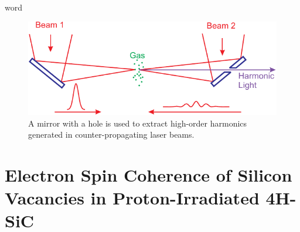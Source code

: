 \documentclass[oneside, astronomy, noacknowlegments]{BYUPhys}
\begin{document}
\begin{appendices}
word
\cite{RefWorks:doc:58929816e4b0499fa95c51a6}
\cite{RefWorks:doc:58929629e4b0d4c09201f6b8}
\cite{RefWorks:doc:589299f4e4b0d4c09201f915}
\cite{RefWorks:doc:58929128e4b0228a292928a7}
\cite{RefWorks:doc:589299fbe4b0dec22aee3bd8}
\cite{RefWorks:doc:5892912ae4b0dec22aee3993}
\cite{RefWorks:doc:58929128e4b0499fa95c5064}
\cite{RefWorks:doc:5892989ee4b0499fa95c51c8}
\cite{RefWorks:doc:589293f5e4b0dec22aee39de}
\cite{RefWorks:doc:589295fce4b0d4c09201f6b4}
\cite{RefWorks:doc:58929a02e4b0d4c09201f91b}
\cite{RefWorks:doc:589295bde4b0d4c09201f692}
\cite{RefWorks:doc:58929264e4b0d4c09201f63b}
\cite{RefWorks:doc:58929129e4b0d4c09201f61e}
\cite{RefWorks:doc:58929602e4b0d4c09201f6b6}
\cite{RefWorks:doc:589296c6e4b0d4c09201f6f5}
\cite{RefWorks:doc:58929746e4b0dec22aee3a9a}
\cite{RefWorks:doc:589297a9e4b0d4c09201f736}
\cite{RefWorks:doc:58929800e4b0499fa95c51a1}
\cite{RefWorks:doc:589299f0e4b0dec22aee3bd6}
\cite{RefWorks:doc:58929786e4b0228a292929b8}
\cite{RefWorks:doc:58929612e4b0499fa95c50fa}
\cite{RefWorks:doc:5892964ee4b0499fa95c5108}
\cite{RefWorks:doc:58929c15e4b0228a29292c58}
\cite{RefWorks:doc:5892912ae4b0228a292928aa}




\begin{figure}
    \centerline{\includegraphics{Graphic1}}
    \caption[Photoluminescence of CdTe]{\label{fig:CdTePL}
     A mirror with a hole is used to extract high-order harmonics generated in
     counter-propagating laser beams.}
 \end{figure}

\chapter{Electron Spin Coherence of Silicon Vacancies in Proton-Irradiated 4H-SiC}
\label{sec:appendc}

\end{appendices}
\end{document}
